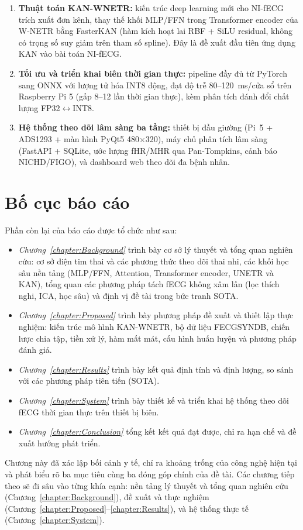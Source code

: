 \documentclass[../DoAn.tex]{subfiles}
\begin{document}
\begin{enumerate}
  \item \textbf{Thuật toán KAN-WNETR:} kiến trúc deep learning mới cho NI-fECG trích xuất đơn kênh, thay thế khối MLP/FFN trong Transformer encoder của W-NETR bằng FasterKAN (hàm kích hoạt lai RBF + SiLU residual, không có trọng số suy giảm trên tham số spline). Đây là đề xuất đầu tiên ứng dụng KAN vào bài toán NI-fECG.
  \item \textbf{Tối ưu và triển khai biên thời gian thực:} pipeline đầy đủ từ PyTorch sang ONNX với lượng tử hóa INT8 động, đạt độ trễ 80--120~ms/cửa sổ trên Raspberry Pi 5 (gấp 8--12 lần thời gian thực), kèm phân tích đánh đổi chất lượng FP32$\leftrightarrow$INT8.
  \item \textbf{Hệ thống theo dõi lâm sàng ba tầng:} thiết bị đầu giường (Pi~5 + ADS1293 + màn hình PyQt5 480$\times$320), máy chủ phân tích lâm sàng (FastAPI + SQLite, ước lượng fHR/MHR qua Pan-Tompkins, cảnh báo NICHD/FIGO), và dashboard web theo dõi đa bệnh nhân.
\end{enumerate}

\section{Bố cục báo cáo}
\label{section:1.7}

Phần còn lại của báo cáo được tổ chức như sau:

\begin{itemize}
  \item \textit{Chương~\ref{chapter:Background}} trình bày cơ sở lý thuyết và tổng quan nghiên cứu: cơ sở điện tim thai và các phương thức theo dõi thai nhi, các khối học sâu nền tảng (MLP/FFN, Attention, Transformer encoder, UNETR và KAN), tổng quan các phương pháp tách fECG không xâm lấn (lọc thích nghi, ICA, học sâu) và định vị đề tài trong bức tranh SOTA.
  \item \textit{Chương~\ref{chapter:Proposed}} trình bày phương pháp đề xuất và thiết lập thực nghiệm: kiến trúc mô hình KAN-WNETR, bộ dữ liệu FECGSYNDB, chiến lược chia tập, tiền xử lý, hàm mất mát, cấu hình huấn luyện và phương pháp đánh giá.
  \item \textit{Chương~\ref{chapter:Results}} trình bày kết quả định tính và định lượng, so sánh với các phương pháp tiên tiến (SOTA).
  \item \textit{Chương~\ref{chapter:System}} trình bày thiết kế và triển khai hệ thống theo dõi fECG thời gian thực trên thiết bị biên.
  \item \textit{Chương~\ref{chapter:Conclusion}} tổng kết kết quả đạt được, chỉ ra hạn chế và đề xuất hướng phát triển.
\end{itemize}

Chương này đã xác lập bối cảnh y tế, chỉ ra khoảng trống của công nghệ hiện tại và phát biểu rõ ba mục tiêu cùng ba đóng góp chính của đề tài. Các chương tiếp theo sẽ đi sâu vào từng khía cạnh: nền tảng lý thuyết và tổng quan nghiên cứu (Chương~\ref{chapter:Background}), đề xuất và thực nghiệm (Chương~\ref{chapter:Proposed}--\ref{chapter:Results}), và hệ thống thực tế (Chương~\ref{chapter:System}).
\end{document}
